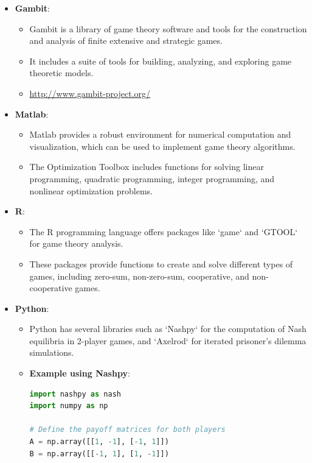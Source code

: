 \documentclass[12pt]{book} %
\begin{document}
\begin{itemize}
    \item \textbf{Gambit}:
        \begin{itemize}
            \item Gambit is a library of game theory software and tools for the construction and analysis of finite extensive and strategic games.
            \item It includes a suite of tools for building, analyzing, and exploring game theoretic models.
            \item \url{http://www.gambit-project.org/}
        \end{itemize}
    \item \textbf{Matlab}:
        \begin{itemize}
            \item Matlab provides a robust environment for numerical computation and visualization, which can be used to implement game theory algorithms.
            \item The Optimization Toolbox includes functions for solving linear programming, quadratic programming, integer programming, and nonlinear optimization problems.
        \end{itemize}
    \item \textbf{R}:
        \begin{itemize}
            \item The R programming language offers packages like `game` and `GTOOL` for game theory analysis.
            \item These packages provide functions to create and solve different types of games, including zero-sum, non-zero-sum, cooperative, and non-cooperative games.
        \end{itemize}
    \item \textbf{Python}:
        \begin{itemize}
            \item Python has several libraries such as `Nashpy` for the computation of Nash equilibria in 2-player games, and `Axelrod` for iterated prisoner's dilemma simulations.
            \item \textbf{Example using Nashpy}:
\begin{lstlisting}[language=Python, caption=Computing Nash Equilibria with Nashpy]
import nashpy as nash
import numpy as np

# Define the payoff matrices for both players
A = np.array([[1, -1], [-1, 1]])
B = np.array([[-1, 1], [1, -1]])


\end{lstlisting}
\end{itemize}
\end{itemize}
\end{document}
